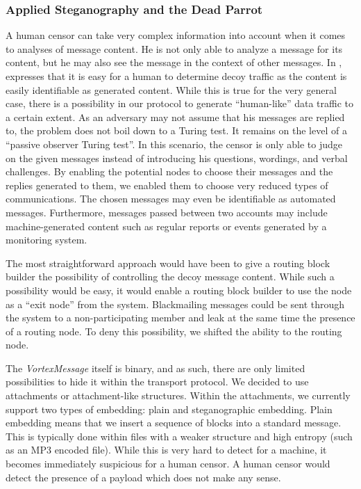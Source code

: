 \documentclass[acmsmall, screen]{acmart}
\begin{document}
\subsubsection{Applied Steganography and the Dead Parrot}
A human censor can take very complex information into account when it comes to analyses of message content. He is not only able to analyze a message for its content, but he may also see the message in the context of other messages. In \cite{oakland2013-parrot}, \citeauthor{oakland2013-parrot}  expresses that it is easy for a human to determine decoy traffic as the content is easily identifiable as generated content. While this is true for the very general case, there is a possibility in our protocol to generate ``human-like'' data traffic to a certain extent. As an adversary may not assume that his messages are replied to, the problem does not boil down to a Turing test. It remains on the level of a ``passive observer Turing test''. In this scenario, the censor is only able to judge on the given messages instead of introducing his questions, wordings, and verbal challenges. By enabling the potential nodes to choose their messages and the replies generated to them, we enabled them to choose very reduced types of communications. The chosen messages may even be identifiable as automated messages. Furthermore, messages passed between two accounts may include machine-generated content such as regular reports or events generated by a monitoring system.

The most straightforward approach would have been to give a routing block builder the possibility of controlling the decoy message content. While such a possibility would be easy, it would enable a routing block builder to use the node as a ``exit node'' from the system. Blackmailing messages could be sent through the system to a non-participating member and leak at the same time the presence of a routing node. To deny this possibility, we shifted the ability to the routing node.

The \emph{VortexMessage} itself is binary, and as such, there are only limited possibilities to hide it within the transport protocol. We decided to use attachments or attachment-like structures. Within the attachments, we currently support two types of embedding: plain and steganographic embedding. Plain embedding means that we insert a sequence of blocks into a standard message. This is typically done within files with a weaker structure and high entropy (such as an MP3 encoded file). While this is very hard to detect for a machine, it becomes immediately suspicious for a human censor. A human censor would detect the presence of a payload which does not make any sense.
\end{document}
